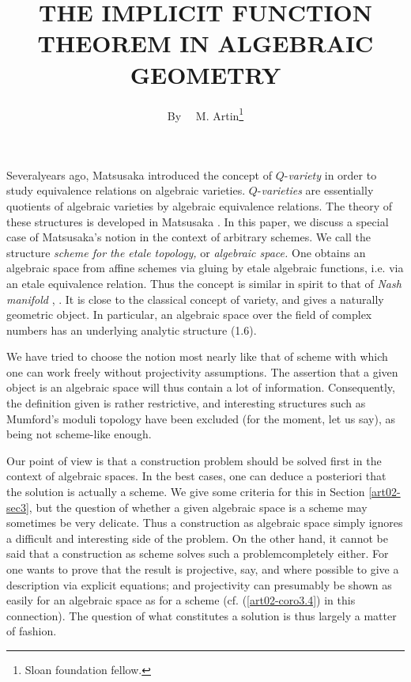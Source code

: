 \title{THE IMPLICIT FUNCTION THEOREM IN ALGEBRAIC GEOMETRY}

\author{By~~ M. Artin\footnote{Sloan foundation fellow.}}

\date{}

\maketitle

\setcounter{pageoriginal}{12}
Several\pageoriginale years ago, Matsusaka introduced the concept of $Q$-{\em variety} in order to study equivalence relations on algebraic varieties. $Q$-{\em varieties} are essentially quotients of algebraic varieties by algebraic equivalence relations. The theory of these structures is developed in Matsusaka \cite{art02-key24}. In this paper, we discuss a special case of Matsusaka's notion in the context of arbitrary schemes. We call the structure {\em scheme for the etale topology,} or {\em algebraic space.} One obtains an algebraic space from affine schemes via gluing by etale algebraic functions, i.e. via an etale equivalence relation. Thus the concept is similar in spirit to that of {\em Nash manifold} \cite{art02-key29}, \cite{art02-key5}. It is close to the classical concept of variety, and gives a naturally geometric object. In particular, an algebraic space over the field of complex numbers has an underlying analytic structure (1.6).

We have tried to choose the notion most nearly like that of scheme with which one can work freely without projectivity assumptions. The assertion that a given object is an algebraic space will thus contain a lot of information. Consequently, the definition given is rather restrictive, and interesting structures such as Mumford's moduli topology \cite{art02-key26} have been excluded (for the moment, let us say), as being not scheme-like enough.

Our point of view is that a construction problem should be solved first in the context of algebraic spaces. In the best cases, one can deduce a posteriori that the solution is actually a scheme. We give some criteria for this in Section \ref{art02-sec3}, but the question of whether a given algebraic space is a scheme may sometimes be very delicate. Thus a construction as algebraic space simply ignores a difficult and interesting side of the problem. On the other hand, it cannot be said that a construction as scheme solves such a problem\pageoriginale completely either. For one wants to prove that the result is projective, say, and where possible to give a description via explicit equations; and projectivity can presumably be shown as easily for an algebraic space as for a scheme (cf. (\ref{art02-coro3.4}) in this connection). The question of what constitutes a solution is thus largely a matter of fashion.

